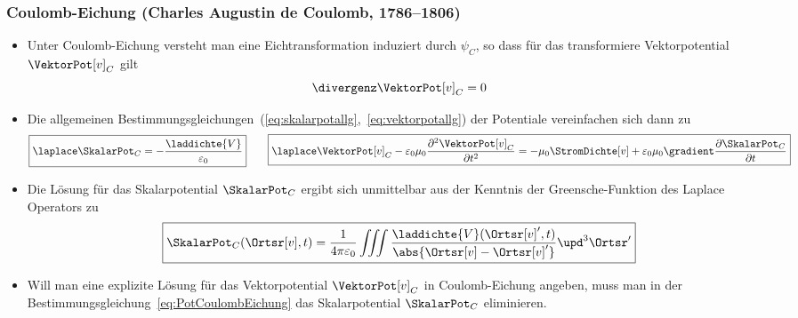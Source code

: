   
  \begin{frame}
  \frametitle{Coulomb-Eichung (Charles Augustin de Coulomb, 1786--1806)}
  \begin{itemize}[<+->]
  \item Unter \alert{Coulomb-Eichung} versteht man eine Eichtransformation induziert durch $\psi_C$, so dass für das transformiere Vektorpotential $\VektorPot[v]_C$ gilt
    \begin{equation}
      \divergenz\VektorPot[v]_C = 0
      \label{eq:CoulombEichung}
    \end{equation}
  \item Die allgemeinen Bestimmungsgleichungen~(\ref{eq:skalarpotallg},~\ref{eq:vektorpotallg}) der Potentiale vereinfachen sich dann zu
    \begin{equation}
      \boxed{\laplace \SkalarPot_C = -\frac{\laddichte{V}}{\varepsilon_0}} \quad\quad \boxed{\laplace\VektorPot[v]_C -\varepsilon_0 \mu_0\frac{\partial^2\VektorPot[v]_C}{\partial t^2} = -\mu_0\StromDichte[v] +\varepsilon_0\mu_0 \gradient\frac{\partial\SkalarPot_C}{\partial t}} 
      \label{eq:PotCoulombEichung}
    \end{equation}
  \item Die Lösung für das Skalarpotential $\SkalarPot_C$ ergibt sich unmittelbar aus der Kenntnis der Greensche-Funktion des Laplace Operators zu
    \begin{equation}
      \boxed{\SkalarPot_C (\Ortsr[v], t) = \frac{1}{4\pi\varepsilon_0} \iiint \frac{\laddichte{V}(\Ortsr[v]^\prime, t)}{\abs{\Ortsr[v]-\Ortsr[v]^\prime}} \upd^3\Ortsr^\prime}
      \label{eq:SkPotC}
    \end{equation}
    \item Will man eine explizite Lösung für das Vektorpotential $\VektorPot[v]_C$ in Coulomb-Eichung angeben, muss man in der Bestimmungsgleichung~\eqref{eq:PotCoulombEichung} das Skalarpotential $\SkalarPot_C$ eliminieren.
    \end{itemize}

    \ 
  \end{frame}
    
